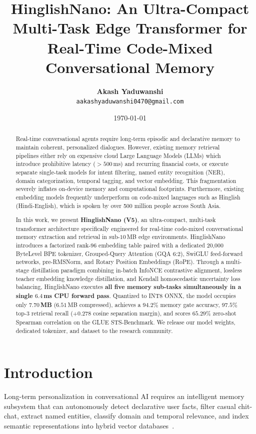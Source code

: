 \documentclass[11pt,a4paper]{article}
\title{\textbf{HinglishNano: An Ultra-Compact Multi-Task Edge Transformer for Real-Time Code-Mixed Conversational Memory}}
\author{
  \textbf{Akash Yaduwanshi} \\
  \texttt{aakashyaduwanshi0470@gmail.com}
}
\date{\today}
\begin{document}
\maketitle

\begin{abstract}
Real-time conversational agents require long-term episodic and declarative memory to maintain coherent, personalized dialogues. However, existing memory retrieval pipelines either rely on expensive cloud Large Language Models (LLMs) which introduce prohibitive latency ($>500$\,ms) and recurring financial costs, or execute separate single-task models for intent filtering, named entity recognition (NER), domain categorization, temporal tagging, and vector embedding. This fragmentation severely inflates on-device memory and computational footprints. Furthermore, existing embedding models frequently underperform on code-mixed languages such as Hinglish (Hindi-English), which is spoken by over 500 million people across South Asia. 

In this work, we present \textbf{HinglishNano (V5)}, an ultra-compact, multi-task transformer architecture specifically engineered for real-time code-mixed conversational memory extraction and retrieval in sub-$10$\,MB edge environments. HinglishNano introduces a factorized rank-96 embedding table paired with a dedicated 20,000 ByteLevel BPE tokenizer, Grouped-Query Attention (GQA 6:2), SwiGLU feed-forward networks, pre-RMSNorm, and Rotary Position Embeddings (RoPE). Through a multi-stage distillation paradigm combining in-batch InfoNCE contrastive alignment, lossless teacher embedding knowledge distillation, and Kendall homoscedastic uncertainty loss balancing, HinglishNano executes \textbf{all five memory sub-tasks simultaneously in a single $6.4$\,ms CPU forward pass}. Quantized to INT8 ONNX, the model occupies only \textbf{$7.70$\,MB} ($6.51$\,MB compressed), achieves a \textbf{$94.2\%$} memory gate accuracy, \textbf{$97.5\%$} top-3 retrieval recall ($+0.278$ cosine separation margin), and scores \textbf{$65.29\%$} zero-shot Spearman correlation on the GLUE STS-Benchmark. We release our model weights, dedicated tokenizer, and dataset to the research community.
\end{abstract}

\section{Introduction}

Long-term personalization in conversational AI requires an intelligent memory subsystem that can autonomously detect declarative user facts, filter casual chit-chat, extract named entities, classify domain and temporal relevance, and index semantic representations into hybrid vector databases~\cite{park2023generative, xu2022beyond}. 
\end{document}
